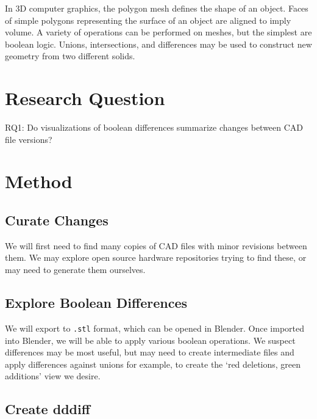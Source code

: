 \documentclass[sigconf,]{acmart}
\begin{document}
In 3D computer graphics, the polygon mesh defines the shape of an object.
Faces of simple polygons representing the surface of an object are aligned to imply volume.
A variety of operations can be performed on meshes, but the simplest are boolean logic.
Unions, intersections, and differences may be used to construct new geometry from two different solids.

\section{Research Question}

RQ1: Do visualizations of boolean differences summarize changes between CAD file versions?

\section{Method}



\subsection{Curate Changes}

We will first need to find many copies of CAD files with minor revisions between them.
We may explore open source hardware repositories trying to find these, or may need to generate them ourselves.

\subsection{Explore Boolean Differences}

We will export to \texttt{.stl} format, which can be opened in Blender.
Once imported into Blender, we will be able to apply various boolean operations.
We suspect differences may be most useful, but may need to create intermediate files and apply differences against unions for example, to create the `red deletions, green additions' view we desire.

\subsection{Create dddiff}
\end{document}
